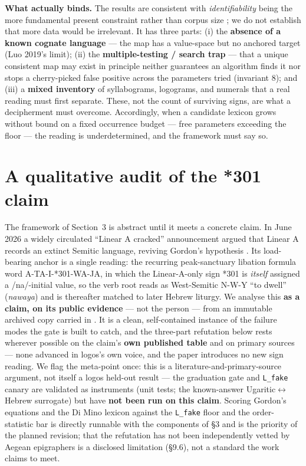 \textbf{What actually binds.} The results are consistent with
\emph{identifiability} being the more fundamental present constraint rather
than corpus size \citep[\S8]{salgarella2025}; we do not establish that more
data would be irrelevant. It has three parts: (i) the \textbf{absence of a
known cognate language} --- the map has a value-space but no anchored
target (Luo 2019's limit); (ii) the \textbf{multiple-testing / search
trap} --- that a unique consistent map may exist in principle neither
guarantees an algorithm finds it nor stops a cherry-picked false positive
across the parameters tried (invariant 8); and (iii) a \textbf{mixed
inventory} of syllabograms, logograms, and numerals that a real reading
must first separate. These, not the count of surviving signs, are what a
decipherment must overcome. Accordingly, when a candidate lexicon grows
without bound on a fixed occurrence budget --- free parameters exceeding
the floor --- the reading is underdetermined, and the framework must say
so.

\section{A qualitative audit of the *301 claim}

The framework of Section~3 is abstract until it meets a concrete claim. In
June 2026 a widely circulated ``Linear A cracked'' announcement
\citep{dimino2026} argued that Linear A records an extinct Semitic
language, reviving Gordon's hypothesis \citep{gordon1957, gordon1966}. Its
load-bearing anchor is a single reading: the recurring peak-sanctuary
libation formula word A-TA-I-*301-WA-JA, in which the Linear-A-only sign
*301 is \emph{itself} assigned a /na/-initial value, so the verb root
reads as West-Semitic N-W-Y ``to dwell'' (\emph{nawaya}) and is thereafter
matched to later Hebrew liturgy. We analyse this \textbf{as a claim, on its
public evidence} --- not the person --- from an immutable archived copy
carried in \artobj. It is a clean, self-contained instance of the failure
modes the gate is built to catch, and the three-part refutation below rests
wherever possible on the claim's \textbf{own published table} and on
primary sources \citep{davis2013, duhoux1992, thomas2020, salgarella2025,
steele2017} --- none advanced in logos's own voice, and the paper
introduces no new sign reading. We flag the meta-point once: this is a
literature-and-primary-source argument, not itself a logos held-out result
--- the graduation gate and \texttt{L\_fake} canary are validated as
instruments (unit tests; the known-answer Ugaritic$\leftrightarrow$Hebrew
surrogate) but have \textbf{not been run on this claim}. Scoring Gordon's
equations and the Di Mino lexicon against the \texttt{L\_fake} floor and
the order-statistic bar is directly runnable with the components of \S3 and
is the priority of the planned revision; that the refutation has not been
independently vetted by Aegean epigraphers is a disclosed limitation
(\S9.6), not a standard the work claims to meet.

